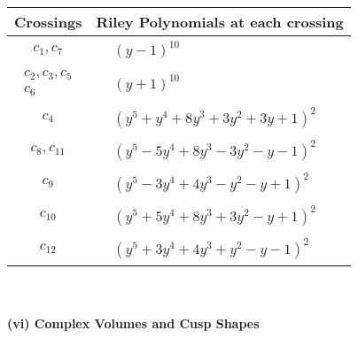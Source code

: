 \documentclass[1p]{elsarticle_modified}
\theoremstyle{definition}
\begin{document}
\begin{tabular}{m{50pt}|m{274pt}}
Crossings & \hspace{64pt}Riley Polynomials at each crossing \\
\hline $$\begin{aligned}c_{1},c_{7}\end{aligned}$$&$\begin{aligned}
&(y-1)^{10}
\end{aligned}$\\
\hline $$\begin{aligned}c_{2},c_{3},c_{5}\\c_{6}\end{aligned}$$&$\begin{aligned}
&(y+1)^{10}
\end{aligned}$\\
\hline $$\begin{aligned}c_{4}\end{aligned}$$&$\begin{aligned}
&(y^5+y^4+8 y^3+3 y^2+3 y+1)^2
\end{aligned}$\\
\hline $$\begin{aligned}c_{8},c_{11}\end{aligned}$$&$\begin{aligned}
&(y^5-5 y^4+8 y^3-3 y^2- y-1)^2
\end{aligned}$\\
\hline $$\begin{aligned}c_{9}\end{aligned}$$&$\begin{aligned}
&(y^5-3 y^4+4 y^3- y^2- y+1)^2
\end{aligned}$\\
\hline $$\begin{aligned}c_{10}\end{aligned}$$&$\begin{aligned}
&(y^5+5 y^4+8 y^3+3 y^2- y+1)^2
\end{aligned}$\\
\hline $$\begin{aligned}c_{12}\end{aligned}$$&$\begin{aligned}
&(y^5+3 y^4+4 y^3+y^2- y-1)^2
\end{aligned}$\\
\hline
\end{tabular}\\~\\
\newpage\flushleft \textbf{(vi) Complex Volumes and Cusp Shapes}
\end{document}
